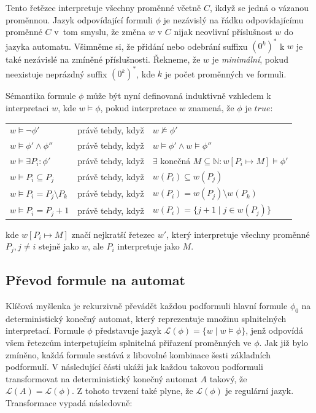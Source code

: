 Tento řetězec interpretuje všechny proměnné včetně $C$, ikdyž se jedná o vázanou proměnnou. Jazyk odpovídající formuli $\phi$ je nezávislý na řádku odpovídajícímu proměnné $C$ v~tom smyslu, že změna $w$ v $C$ nijak neovlivní příslušnost $w$ do jazyka automatu. Všimněme si, že přidání nebo odebrání suffixu $(0^k)^*$ k $w$ je také nezávislé na zmíněné příslušnosti. Řekneme, že $w$ je \textit{minimální}, pokud neexistuje neprázdný suffix $(0^k)^*$, kde $k$ je počet proměnných ve formuli.

Sémantika formule $\phi$ může být nyní definovaná induktivně vzhledem k interpretaci $w$, kde $w \vDash \phi$, pokud interpretace $w$ znamená, že $\phi$ je $true$:

\begin{center}
    \begin{tabular}{ l l l } 
        $w \vDash \neg \phi'$ & právě tehdy, když & $w \nvDash \phi'$  \\
        $w \vDash \phi' \wedge \phi''$ & právě tehdy, když & $w \vDash \phi' \wedge w \vDash \phi'' $  \\
        $w \vDash \exists P_i : \phi' $ & právě tehdy, když & $ \exists$ konečná $M \subseteq \mathbb{N} : w [ P_i \mapsto M ] \vDash \phi' $ \\
        $w \vDash P_i \subseteq P_j $ & právě tehdy, když & $ w(P_i) \subseteq w(P_j) $  \\
        $w \vDash P_i = P_j \setminus P_k $ & právě tehdy, když & $ w(P_i) = w(P_j) \setminus w(P_k) $  \\
        $w \vDash P_i = P_j + 1 $ & právě tehdy, když & $ w(P_i) = \{ j+1 \mid j \in w(P_j) \} $   \\
    \end{tabular}
\end{center}

kde $ w [ P_i \mapsto M ] $ značí nejkratší řetezec $w'$, který interpretuje všechny proměnné $ P_j, j \neq i$ stejně jako $ w $, ale $P_i$ interpretuje jako $M$.

\subsection{Převod formule na automat}

Klíčová myšlenka je rekurzivně převádět každou podformuli hlavní formule $\phi_0$ na deterministický konečný automat, který reprezentuje množinu splnitelných interpretací. Formule $\phi$ představuje jazyk $ \mathcal{L}(\phi) = \{ w \mid w \vDash \phi \} $, jenž odpovídá všem řetezcům interpetujícím splnitelná přiřazení proměnných ve $\phi$. Jak již bylo zmíněno, každá formule sestává z libovolné kombinace šesti základních podformulí. V následující části ukáži jak každou takovou podformuli transformovat na deterministický konečný automat $A$ takový, že $ \mathcal{L}(A) = \mathcal{L}(\phi) $. Z tohoto trvzení také plyne, že $ \mathcal{L}(\phi) $ je regulární jazyk. Transformace vypadá následovně:

